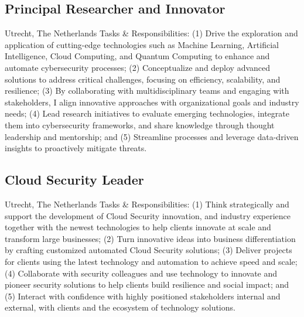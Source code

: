 \documentclass[print]{styles/friggeri-cv-mac} %
\begin{document}
\subsection{Principal Researcher and Innovator}\vspace{-5pt}
\begin{entrylist}
	{Utrecht, The Netherlands}
	{Tasks \& Responsibilities: (1) Drive the exploration and application of cutting-edge technologies such as Machine Learning, Artificial Intelligence, Cloud Computing, and Quantum Computing to enhance and automate cybersecurity processes; (2) Conceptualize and deploy advanced solutions to address critical challenges, focusing on efficiency, scalability, and resilience; (3) By collaborating with multidisciplinary teams and engaging with stakeholders, I align innovative approaches with organizational goals and industry needs; (4) Lead research initiatives to evaluate emerging technologies, integrate them into cybersecurity frameworks, and share knowledge through thought leadership and mentorship; and (5) Streamline processes and leverage data-driven insights to proactively mitigate threats.}
\end{entrylist}

\subsection{Cloud Security Leader}\vspace{-5pt}
\begin{entrylist}
{Utrecht, The Netherlands}
{Tasks \& Responsibilities: (1) Think strategically and support the development of Cloud Security innovation, and industry experience together with the newest technologies to help clients innovate at scale and transform large businesses; (2) Turn innovative ideas into business differentiation by crafting customized automated Cloud Security solutions; (3) Deliver projects for clients using the latest technology and automation to achieve speed and scale; (4) Collaborate with security colleagues and use technology to innovate and pioneer security solutions to help clients build resilience and social impact; and (5) Interact with confidence with highly positioned stakeholders internal and external, with clients and the ecosystem of technology solutions.}
\end{entrylist}

\end{document}
